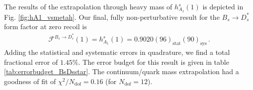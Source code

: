 
The results of the extrapolation through heavy mass of $h_{A_1}^s(1)$ is depicted in Fig. \ref{fig:hA1_vsmetah}. Our final, fully non-perturbative result for the $B_s\to D_s^*$ form factor at zero recoil is
\begin{align}
  \mathcal{F}^{B_s\to D_s^*}(1) = h^s_{A_1}(1) = 0.9020(96)_{\text{stat}}(90)_{\text{sys}}\,.
  \label{eq:finalresult_hA1}
\end{align}
Adding the statistical and systematic errors in quadrature, we find a total fractional error of $1.45\%$. The error budget for this result is given in table \ref{tab:errorbudget_BsDsstar}. The continuum/quark mass extrapolation had a goodness of fit of $\chi^2/N_{\text{dof}} = 0.16$ (for $N_{\text{dof}}=12$).

